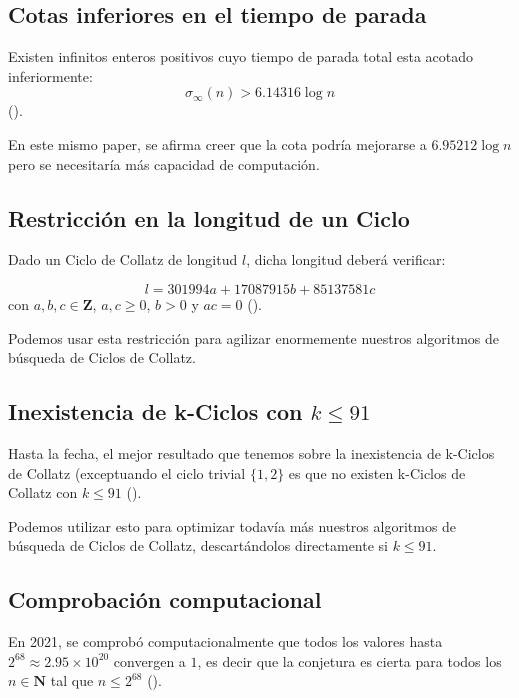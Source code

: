 \subsection{Cotas inferiores en el tiempo de parada}
Existen infinitos enteros positivos cuyo tiempo de parada total esta acotado inferiormente:
$$\sigma_{\infty}(n)>6.14316 \log n$$
(\cite{LowerBoundsStoppingTime}).

En este mismo paper, se afirma creer que la cota podría mejorarse a $6.95212 \log n$ pero se necesitaría más capacidad de computación.



\subsection{Restricción en la longitud de un Ciclo}
Dado un Ciclo de Collatz de longitud $l$, dicha longitud deberá verificar:

\begin{equation}
    \label{RestriccionLongitudCiclo}
    l = 301 994a + 17 087 915b + 85 137 581c
\end{equation}
con $a,b,c \in \mathbf{Z}$, $a,c\geq 0$, $b>0$ y $ac=0$ (\cite{LowerBoundsCycleLength}).

Podemos usar esta restricción para agilizar enormemente nuestros algoritmos de búsqueda de Ciclos de Collatz.




\subsection{Inexistencia de k-Ciclos con $k\leq91$}
Hasta la fecha, el mejor resultado que tenemos sobre la inexistencia de k-Ciclos de Collatz (exceptuando el ciclo trivial $\{1,2\}$ es que no existen k-Ciclos de Collatz con $k\leq91$ (\cite{hercher2023collatzmcycles}).

Podemos utilizar esto para optimizar todavía más nuestros algoritmos de búsqueda de Ciclos de Collatz, descartándolos directamente si $k\leq91$.



\subsection{Comprobación computacional}
En 2021, se comprobó computacionalmente que todos los valores hasta $2^{68} \approx 2.95 \times 10^{20}$ convergen a $1$, es decir que la conjetura es cierta para todos los $n\in\mathbf{N}$ tal que $n\leq2^{68}$ (\cite{Barina2021}).



